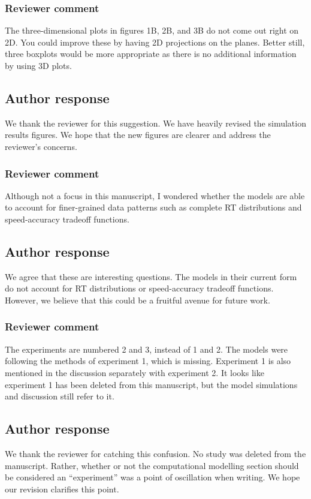 \documentclass[12pt]{article}
\begin{document}
\subsubsection{Reviewer comment}
The three-dimensional plots in figures 1B, 2B, and 3B do not
come out right on 2D. You could improve these by having 2D
projections on the planes. Better still, three boxplots
would be more appropriate as there is no additional
information by using 3D plots.

\subsection{Author response}
We thank the reviewer for this suggestion. We have heavily
revised the simulation results figures. We hope that the new
figures are clearer and address the reviewer's concerns.

\subsubsection{Reviewer comment}
Although not a focus in this manuscript, I wondered whether
the models are able to account for finer-grained data
patterns such as complete RT distributions and
speed-accuracy tradeoff functions.

\subsection{Author response}
We agree that these are interesting questions. The models in
their current form do not account for RT distributions or
speed-accuracy tradeoff functions. However, we believe that
this could be a fruitful avenue for future work. 

\subsubsection{Reviewer comment}
The experiments are numbered 2 and 3, instead of 1 and 2.
The models were following the methods of experiment 1, which
is missing. Experiment 1 is also mentioned in the discussion
separately with experiment 2. It looks like experiment 1 has
been deleted from this manuscript, but the model simulations
and discussion still refer to it.

\subsection{Author response}
We thank the reviewer for catching this confusion. No study
was deleted from the manuscript. Rather, whether or not the
computational modelling section should be considered an
``experiment'' was a point of oscillation when writing. We
hope our revision clarifies this point.
\end{document}

